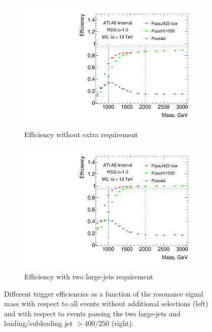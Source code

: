 \begin{figure}[htbp!]
\centering
\captionsetup{justification=centering}
    \begin{subfigure}[b]{0.45\textwidth}
        \includegraphics[width=\textwidth,angle=-90]{figures/boosted/Trigger/app_trig_b77_Efficiency_PreSel.pdf}
        \caption{Efficiency without extra requirement}
        \label{fig:boosted-trigger-HLT_Pre}
    \end{subfigure}
    \quad
    \begin{subfigure}[b]{0.45\textwidth}
        \includegraphics[width=\textwidth,angle=-90]{figures/boosted/Trigger/app_trig_b77_Efficiency_All.pdf}
        \caption{Efficiency with two large-\R jets requirement}
        \label{fig:boosted-trigger-HLT_All}
    \end{subfigure}
\caption{Different trigger efficiencies as a function of the resonance signal mass with respect to all events without additional selections (left) and with respect to events passing the two large-\R jets and leading/subleading jet \pt $> 400/250$ \GeV (right).}
\label{fig:boosted-trigger-HLT}
\end{figure}

